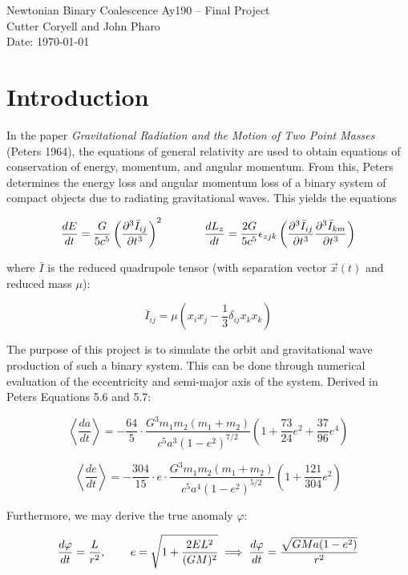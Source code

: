 \documentclass[11pt,letterpaper]{article}
\begin{document}
\begin{center}
\Large
Newtonian Binary Coalescence
Ay190 -- Final Project\\
Cutter Coryell and John Pharo\\
Date: \today
\end{center}

\section{Introduction}

In the paper \textit{Gravitational Radiation and the Motion of Two Point Masses} (Peters 1964), the equations of general relativity are used to obtain equations of conservation of energy, momentum, and angular momentum. From this, Peters determines the energy loss and angular momentum loss of a binary system of compact objects due to radiating gravitational waves. This yields the equations

$$ \frac{dE}{dt} = \frac{G}{5c^5} \left( \frac{\partial^3 \bar{I}_{ij}}{\partial t^3} \right)^2 \hspace*{.5in} \frac{dL_z}{dt} = \frac{2G}{5c^5} \epsilon_{zjk} \left( \frac{\partial^3 \bar{I}_{ij}}{\partial t^3} \frac{\partial^3 \bar{I}_{km}}{\partial t^3} \right) $$

where $\bar{I}$ is the reduced quadrupole tensor (with separation vector $\vec{x} (t)$ and reduced mass $\mu$):

$$ \bar{I}_{ij}  =\mu (x_i x_j - \frac{1}{3} \delta_{ij} x_k x_k) $$

The purpose of this project is to simulate the orbit and gravitational wave production of such a binary system. This can be done through numerical evaluation of the eccentricity and semi-major axis of the system. Derived in Peters Equations 5.6 and 5.7:

$$ \left< \frac{da}{dt} \right> = - \frac{64}{5} \cdot \frac{G^3 m_1 m_2 (m_1 + m_2)}{c^5 a^3 (1 - e^2)^{7/2}} \left( 1 + \frac{73}{24} e^2 + \frac{37}{96} e^4 \right) $$

$$ \left< \frac{de}{dt} \right> = - \frac{304}{15} \cdot e \cdot \frac{G^3 m_1 m_2 (m_1 + m_2)}{c^5 a^4 (1 - e^2)^{5/2}} \left( 1 + \frac{121}{304}e^2 \right) $$

Furthermore, we may derive the true anomaly $\varphi$:

$$ \frac{d \varphi}{dt} = \frac{L}{r^2}, \hspace*{.3in} e = \sqrt{1 + \frac{2EL^2}{(GM)^2}} \implies \frac{d \varphi}{dt} = \frac{\sqrt{GMa(1 - e^2)}}{r^2} $$
\end{document}
